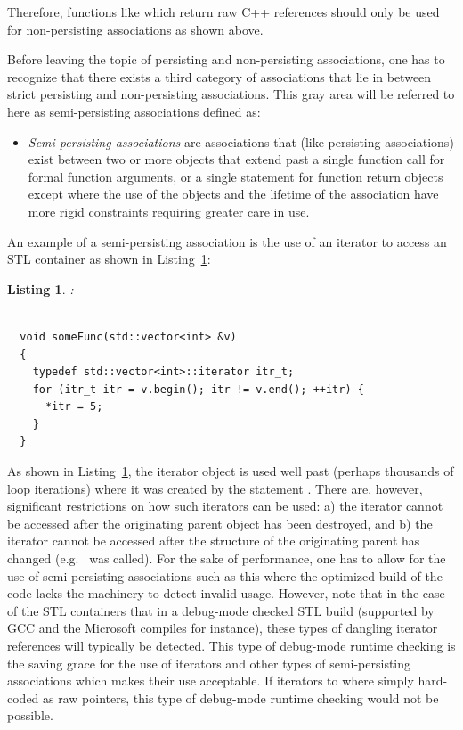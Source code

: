 \documentclass[pdf,ps2pdf,11pt]{SANDreport}
\newtheorem{listing}{Listing}
\begin{document}
Therefore, functions like {}
which return raw C++ references should only be used for non-persisting
associations as shown above.

Before leaving the topic of persisting and non-persisting associations, one
has to recognize that there exists a third category of associations that lie
in between strict persisting and non-persisting associations.  This gray area
will be referred to here as semi-persisting associations defined as:

\begin{itemize}

{}\item\textit{Semi-persisting associations} are associations that (like
persisting associations) exist between two or more objects that extend past a
single function call for formal function arguments, or a single statement for
function return objects except where the use of the objects and the lifetime
of the association have more rigid constraints requiring greater care in use.

\end{itemize}

An example of a semi-persisting association is the use of an iterator
to access an STL container as shown in
Listing~\ref{listing:SemiPersistingIterators}:


\begin{listing}:\\
\label{listing:SemiPersistingIterators}
{\small\begin{verbatim}

  void someFunc(std::vector<int> &v)
  {
    typedef std::vector<int>::iterator itr_t;
    for (itr_t itr = v.begin(); itr != v.end(); ++itr) {
      *itr = 5;
    }
  }
\end{verbatim}}
\end{listing}


As shown in Listing~\ref{listing:SemiPersistingIterators}, the iterator
object {} is used well past (perhaps thousands of loop iterations)
where it was created by the statement {}.  There
are, however, significant restrictions on how such iterators can be used: a)
the iterator cannot be accessed after the originating parent object has been
destroyed, and b) the iterator cannot be accessed after the structure of the
originating parent has changed (e.g.\ {} was called).  For
the sake of performance, one has to allow for the use of semi-persisting
associations such as this where the optimized build of the code lacks the
machinery to detect invalid usage.  However, note that in the case of the STL
containers that in a debug-mode checked STL build (supported by GCC and the
Microsoft compiles for instance), these types of dangling iterator references
will typically be detected.  This type of debug-mode runtime checking is the
saving grace for the use of iterators and other types of semi-persisting
associations which makes their use acceptable.  If iterators to
{} where simply hard-coded as raw pointers, this type of
debug-mode runtime checking would not be possible.
\end{document}
